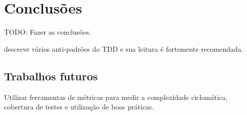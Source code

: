 \chapter{Conclusões} %
\label{cha:conclusoes}

TODO: Fazer as conclusões.

 descreve vários anti-padrões do TDD e sua leitura é fortemente recomendada.


\section{Trabalhos futuros} %
\label{sec:trabalhos_futuros}

Utilizar ferramentas de métricas para medir a complexidade ciclomática, cobertura de testes e utilização de boas práticas.

